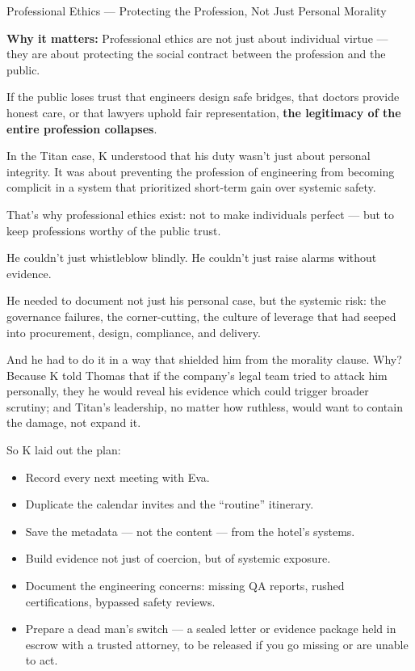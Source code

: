 \begin{HistoricalSidebar}{Professional Ethics --- Protecting the Profession, Not Just Personal Morality}
    \medskip
    
    \textbf{Why it matters:} Professional ethics are not just about individual virtue — they are about protecting the social contract between the profession and the public.

    \medskip
    
    If the public loses trust that engineers design safe bridges, that doctors provide honest care, or that lawyers uphold fair representation,  \textbf{the legitimacy of the entire profession collapses}.
    
    \medskip
    
    In the Titan case, K understood that his duty wasn’t just about personal integrity.  
    It was about preventing the profession of engineering from becoming complicit in a system that prioritized short-term gain over systemic safety.

    \medskip
    
    That’s why professional ethics exist:  
    not to make individuals perfect — but to keep professions worthy of the public trust.
    
\end{HistoricalSidebar}

\medskip

He couldn’t just whistleblow blindly.  He couldn’t just raise alarms without evidence.

He needed to document not just his personal case,
but the systemic risk: 
the governance failures, the corner-cutting, the culture of leverage that had seeped into procurement, design, compliance, and delivery.

And he had to do it in a way that shielded him from the morality clause.
Why?
Because K told Thomas that if the company’s legal team tried to attack him personally,
they he would reveal his evidence which could trigger broader scrutiny;
and Titan’s leadership, no matter how ruthless, would want to contain the damage, not expand it.

So K laid out the plan:

\begin{itemize}
    \item Record every next meeting with Eva.
    \item Duplicate the calendar invites and the “routine” itinerary.
    \item Save the metadata — not the content — from the hotel’s systems.
    \item Build evidence not just of coercion, but of systemic exposure.
    \item Document the engineering concerns: missing QA reports, rushed certifications, bypassed safety reviews.
    \item Prepare a dead man’s switch — a sealed letter or evidence package held in escrow with a trusted attorney, to be released if you go missing or are unable to act.
\end{itemize}

